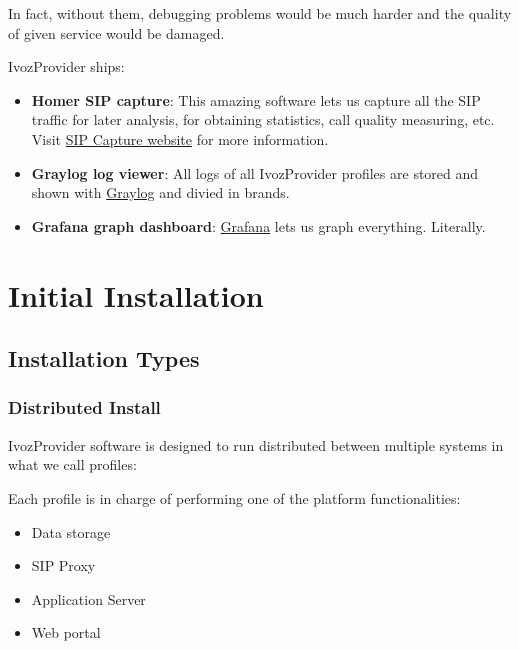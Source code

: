 \documentclass[letterpaper,10pt,english]{sphinxmanual}
\begin{document}
In fact, without them, debugging problems would be much harder and the quality
of given service would be damaged.

IvozProvider ships:
\begin{itemize}
\item {} 
\textbf{Homer SIP capture}: This amazing software lets us capture all the SIP traffic
for later analysis, for obtaining statistics, call quality measuring, etc.
Visit \href{http://sipcapture.org/}{SIP Capture website} for more information.

\item {} 
\textbf{Graylog log viewer}: All logs of all IvozProvider profiles are stored and
shown with \href{https://www.graylog.org/}{Graylog} and divied in brands.

\item {} 
\textbf{Grafana graph dashboard}: \href{http://grafana.org/}{Grafana} lets us graph
everything. Literally.

\end{itemize}


\chapter{Initial Installation}
\label{basics/installation/index::doc}\label{basics/installation/index:initial-installation}

\section{Installation Types}
\label{basics/installation/install_types::doc}\label{basics/installation/install_types:installation-types}

\subsection{Distributed Install}
\label{basics/installation/install_types:distributed-install}
IvozProvider software is designed to run distributed between multiple systems
in what we call profiles:

Each profile is in charge of performing one of the platform functionalities:
\begin{itemize}
\item {} 
Data storage

\item {} 
SIP Proxy

\item {} 
Application Server

\item {} 
Web portal

\end{itemize}
\end{document}
